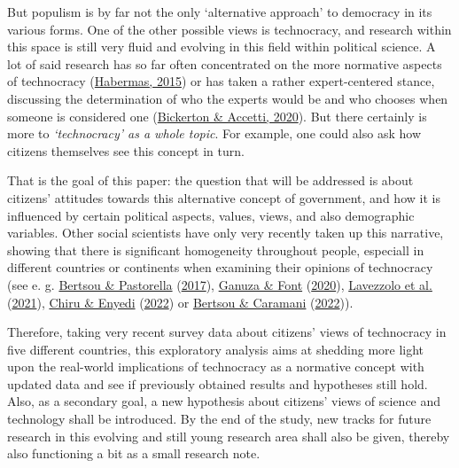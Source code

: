\documentclass[
  12pt,
  english,
]{article}
\begin{document}
But populism is by far not the only `alternative approach' to democracy
in its various forms. One of the other possible views is technocracy,
and research within this space is still very fluid and evolving in this
field within political science. A lot of said research has so far often
concentrated on the more normative aspects of technocracy
(\protect\hyperlink{ref-habermas2015lure}{Habermas, 2015}) or has taken
a rather expert-centered stance, discussing the determination of who the
experts would be and who chooses when someone is considered one
(\protect\hyperlink{ref-bickerton2020technocracy}{Bickerton \& Accetti,
2020}). But there certainly is more to \emph{`technocracy' as a whole
topic}. For example, one could also ask how citizens themselves see this
concept in turn.

That is the goal of this paper: the question that will be addressed is
about citizens' attitudes towards this alternative concept of
government, and how it is influenced by certain political aspects,
values, views, and also demographic variables. Other social scientists
have only very recently taken up this narrative, showing that there is
significant homogeneity throughout people, especiall in different
countries or continents when examining their opinions of technocracy
(see e. g. \protect\hyperlink{ref-bertsou2017technocratic}{Bertsou \&
Pastorella} (\protect\hyperlink{ref-bertsou2017technocratic}{2017}),
\protect\hyperlink{ref-ganuza2020experts}{Ganuza \& Font}
(\protect\hyperlink{ref-ganuza2020experts}{2020}),
\protect\hyperlink{ref-lavezzolo2021will}{Lavezzolo et al.}
(\protect\hyperlink{ref-lavezzolo2021will}{2021}),
\protect\hyperlink{ref-chiru2022wants}{Chiru \& Enyedi}
(\protect\hyperlink{ref-chiru2022wants}{2022}) or
\protect\hyperlink{ref-bertsou2022people}{Bertsou \& Caramani}
(\protect\hyperlink{ref-bertsou2022people}{2022})).

Therefore, taking very recent survey data about citizens' views of
technocracy in five different countries, this exploratory analysis aims
at shedding more light upon the real-world implications of technocracy
as a normative concept with updated data and see if previously obtained
results and hypotheses still hold. Also, as a secondary goal, a new
hypothesis about citizens' views of science and technology shall be
introduced. By the end of the study, new tracks for future research in
this evolving and still young research area shall also be given, thereby
also functioning a bit as a small research note.

\newpage{}
\end{document}
